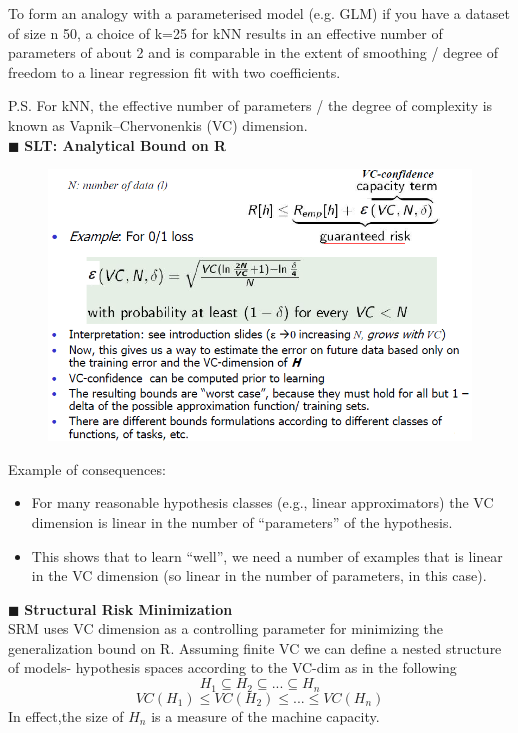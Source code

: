 \documentclass[../main.tex]{subfiles}
\begin{document}
To form an analogy with a parameterised model (e.g. GLM) if you have a dataset of size n 50, a choice of k=25 for kNN results in an effec­tive number of parameters of about 2 and is comparable in the extent of smoothing / degree of freedom to a linear regression fit with two coefficients.

P.S. For kNN, the effective number of parameters / the degree of complexity is known as Vapnik–Chervonenkis (VC) dimension.\\

\noindent $\blacksquare$ \textbf{SLT: Analytical Bound on R}
\begin{figure}[H]
    \centering
    \includegraphics[scale = 0.6]{lectures/5_validation/5_slt.png}
\end{figure}
Example of consequences:
\begin{itemize}
    \item For many reasonable hypothesis classes (e.g., linear approximators) the VC dimension is linear in the number of “parameters” of the hypothesis.
    \item This shows that to learn “well”, we need a number of examples that is linear in the VC dimension (so linear in the number of parameters, in this case).
\end{itemize}

\noindent $\blacksquare$ \textbf{Structural Risk Minimization}\\
\noindent SRM uses VC dimension as a controlling parameter for minimizing the generalization bound on R. Assuming finite VC we can define a nested structure of models- hypothesis spaces according to the VC-dim as in the following
$$H_1\subseteq H_2 \subseteq ... \subseteq H_n$$
$$VC(H_1)\leq VC(H_2) \leq ... \leq VC(H_n)$$
In effect,the size of $H_n$ is a measure of the machine capacity.\\
\end{document}
